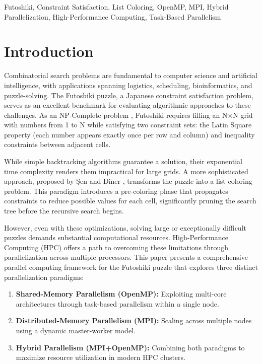 \documentclass[10pt, conference]{IEEEtran}
\begin{document}
\begin{IEEEkeywords}
Futoshiki, Constraint Satisfaction, List Coloring, OpenMP, MPI, Hybrid Parallelization, High-Performance Computing, Task-Based Parallelism
\end{IEEEkeywords}

\section{Introduction}
Combinatorial search problems are fundamental to computer science and artificial intelligence, with applications spanning logistics, scheduling, bioinformatics, and puzzle-solving. The Futoshiki puzzle, a Japanese constraint satisfaction problem, serves as an excellent benchmark for evaluating algorithmic approaches to these challenges. As an NP-Complete problem \cite{Sen2024Futoshiki}, Futoshiki requires filling an N×N grid with numbers from 1 to N while satisfying two constraint sets: the Latin Square property (each number appears exactly once per row and column) and inequality constraints between adjacent cells.

While simple backtracking algorithms guarantee a solution, their exponential time complexity renders them impractical for large grids. A more sophisticated approach, proposed by Şen and Diner \cite{Sen2024Futoshiki}, transforms the puzzle into a list coloring problem. This paradigm introduces a pre-coloring phase that propagates constraints to reduce possible values for each cell, significantly pruning the search tree before the recursive search begins.

However, even with these optimizations, solving large or exceptionally difficult puzzles demands substantial computational resources. High-Performance Computing (HPC) offers a path to overcoming these limitations through parallelization across multiple processors. This paper presents a comprehensive parallel computing framework for the Futoshiki puzzle that explores three distinct parallelization paradigms:

\begin{enumerate}
    \item \textbf{Shared-Memory Parallelism (OpenMP):} Exploiting multi-core architectures through task-based parallelism within a single node.
    \item \textbf{Distributed-Memory Parallelism (MPI):} Scaling across multiple nodes using a dynamic master-worker model.
    \item \textbf{Hybrid Parallelism (MPI+OpenMP):} Combining both paradigms to maximize resource utilization in modern HPC clusters.
\end{enumerate}
\end{document}
